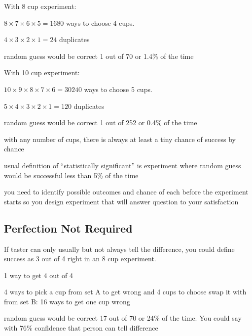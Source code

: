 \documentclass[landscape]{exam}
\begin{document}
  With 8 cup experiment:
  \begin{itemize*}
    \item $8 \times 7 \times 6 \times 5 = 1680$ ways to choose 4 cups.  
    \item $4 \times 3 \times 2 \times 1 = 24$ duplicates
    \item random guess would be correct 1 out of 70 or 1.4\% of the time
  \end{itemize*}

  With 10 cup experiment:
  \begin{itemize*}
    \item $10 \times 9 \times 8 \times 7 \times 6 = 30240$ ways to choose 5 cups.  
    \item $5 \times 4 \times 3 \times 2 \times 1 = 120$ duplicates
    \item random guess would be correct 1 out of 252 or 0.4\% of the time
  \end{itemize*}

  \begin{itemize*}
    \item with any number of cups, there is always at least a tiny chance of
      success by chance
    \item usual definition of ``statistically significant'' is experiment where
      random guess would be successful less than 5\% of the time
    \item you need to identify possible outcomes and chance of each before the
      experiment starts so you design experiment that will answer question to
      your satisfaction
  \end{itemize*}

  \subsection{Perfection Not Required}
  If taster can only usually but not always tell the difference, you could
  define success as 3 out of 4 right in an 8 cup experiment.

  \begin{itemize*}
    \item 1 way to get 4 out of 4
    \item 4 ways to pick a cup from set A to get wrong and 4 cups to choose swap
      it with from set B: 16 ways to get one cup wrong
    \item random guess would be correct 17 out of 70 or 24\% of the time.  You
      could say with 76\% confidence that person can tell difference
  \end{itemize*}
\end{document}
